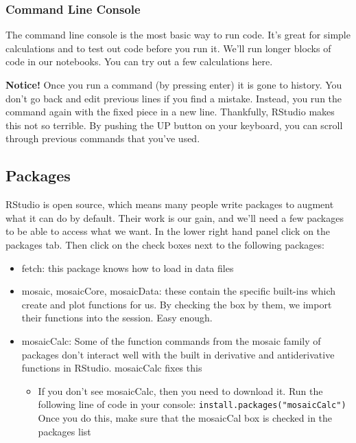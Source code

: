 \documentclass[
]{book}
\providecommand{\tightlist}{%
  \setlength{\itemsep}{0pt}\setlength{\parskip}{0pt}}
\begin{document}
\hypertarget{command-line-console}{%
\subsubsection{Command Line Console}\label{command-line-console}}

The command line console is the most basic way to run code. It's great for simple calculations and to test out code before you run it. We'll run longer blocks of code in our notebooks. You can try out a few calculations here.

\textbf{Notice!} Once you run a command (by pressing enter) it is gone to history. You don't go back and edit previous lines if you find a mistake. Instead, you run the command again with the fixed piece in a new line. Thankfully, RStudio makes this not so terrible. By pushing the UP button on your keyboard, you can scroll through previous commands that you've used.

\hypertarget{packages}{%
\subsection{Packages}\label{packages}}

RStudio is open source, which means many people write packages to augment what it can do by default. Their work is our gain, and we'll need a few packages to be able to access what we want. In the lower right hand panel click on the packages tab. Then click on the check boxes next to the following packages:

\begin{itemize}
\tightlist
\item
  fetch: this package knows how to load in data files
\item
  mosaic, mosaicCore, mosaicData: these contain the specific built-ins which create and plot functions for us. By checking the box by them, we import their functions into the session. Easy enough.
\item
  mosaicCalc: Some of the function commands from the mosaic family of packages don't interact well with the built in derivative and antiderivative functions in RStudio. mosaicCalc fixes this

  \begin{itemize}
  \tightlist
  \item
    If you don't see mosaicCalc, then you need to download it. Run the following line of code in your console: \texttt{install.packages("mosaicCalc")} Once you do this, make sure that the mosaicCal box is checked in the packages list
  \end{itemize}
\end{itemize}
\end{document}
